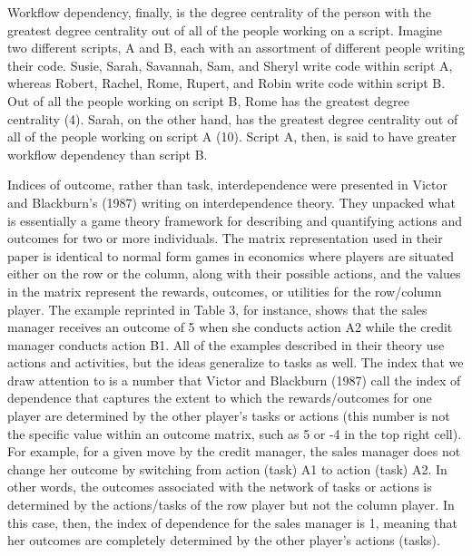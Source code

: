 \documentclass[english,,man]{apa6}
\theoremstyle{definition}
\theoremstyle{definition}
\theoremstyle{definition}
\theoremstyle{remark}
\begin{document}
Workflow dependency, finally, is the degree centrality of the person
with the greatest degree centrality out of all of the people working on
a script. Imagine two different scripts, A and B, each with an
assortment of different people writing their code. Susie, Sarah,
Savannah, Sam, and Sheryl write code within script A, whereas Robert,
Rachel, Rome, Rupert, and Robin write code within script B. Out of all
the people working on script B, Rome has the greatest degree centrality
(4). Sarah, on the other hand, has the greatest degree centrality out of
all of the people working on script A (10). Script A, then, is said to
have greater workflow dependency than script B.

Indices of outcome, rather than task, interdependence were presented in
Victor and Blackburn's (1987) writing on interdependence theory. They
unpacked what is essentially a game theory framework for describing and
quantifying actions and outcomes for two or more individuals. The matrix
representation used in their paper is identical to normal form games in
economics where players are situated either on the row or the column,
along with their possible actions, and the values in the matrix
represent the rewards, outcomes, or utilities for the row/column player.
The example reprinted in Table 3, for instance, shows that the sales
manager receives an outcome of 5 when she conducts action A2 while the
credit manager conducts action B1. All of the examples described in
their theory use actions and activities, but the ideas generalize to
tasks as well. The index that we draw attention to is a number that
Victor and Blackburn (1987) call the index of dependence that captures
the extent to which the rewards/outcomes for one player are determined
by the other player's tasks or actions (this number is not the specific
value within an outcome matrix, such as 5 or -4 in the top right cell).
For example, for a given move by the credit manager, the sales manager
does not change her outcome by switching from action (task) A1 to action
(task) A2. In other words, the outcomes associated with the network of
tasks or actions is determined by the actions/tasks of the row player
but not the column player. In this case, then, the index of dependence
for the sales manager is 1, meaning that her outcomes are completely
determined by the other player's actions (tasks).
\end{document}
